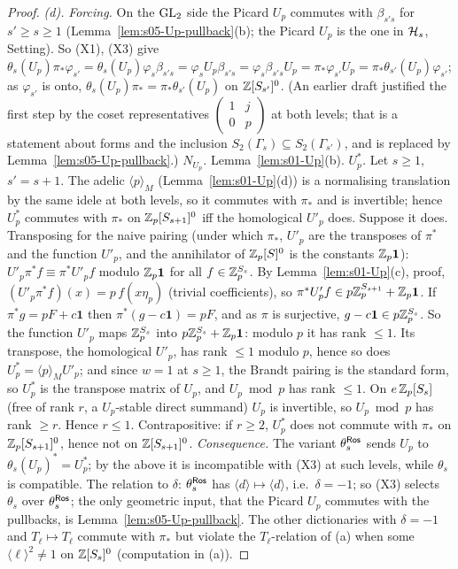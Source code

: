 \begin{proof}
\emph{(d).} \emph{Forcing.} On the $\mathrm{GL}_2$ side the Picard $U_p$ commutes with $\beta_{s's}$ for $s'\ge s\ge1$
(Lemma~\ref{lem:s05-Up-pullback}(b); the Picard $U_p$ is the one in $\mathcal{H}_s$, Setting). So (X1), (X3) give
$\theta_s(U_p)\pi_*\varphi_{s'}=\theta_s(U_p)\varphi_s\beta_{s's}=\varphi_sU_p\beta_{s's}=\varphi_s\beta_{s's}U_p=\pi_*\varphi_{s'}U_p=\pi_*\theta_{s'}(U_p)\varphi_{s'}$; as
$\varphi_{s'}$ is onto, $\theta_s(U_p)\pi_*=\pi_*\theta_{s'}(U_p)$ on $\mathbb{Z}[S_{s'}]^0$. (An earlier draft justified the first step by the coset
representatives $\left(\begin{smallmatrix}1&j\\0&p\end{smallmatrix}\right)$ at both levels; that is a statement about forms and the inclusion
$S_2(\Gamma_s)\subseteq S_2(\Gamma_{s'})$, and is replaced by Lemma~\ref{lem:s05-Up-pullback}.)
\emph{$N_{U_p}$.} Lemma~\ref{lem:s01-Up}(b).
\emph{$U_p^*$.} Let $s\ge1$, $s'=s+1$. The adelic $\langle p\rangle_M$ (Lemma~\ref{lem:s01-Up}(d)) is a normalising translation by the same
idele at both levels, so it commutes with $\pi_*$ and is invertible; hence $U_p^*$ commutes with $\pi_*$ on $\mathbb{Z}_p[S_{s+1}]^0$ iff the
homological $U'_p$ does. Suppose it does. Transposing for the naive pairing (under which $\pi_*$, $U'_p$ are the transposes of $\pi^*$
and the function $U'_p$, and the annihilator of $\mathbb{Z}_p[S]^0$ is the constants $\mathbb{Z}_p\mathbf 1$): $U'_p\pi^*f\equiv\pi^*U'_pf$ modulo $\mathbb{Z}_p\mathbf 1$ for all
$f\in\mathbb{Z}_p^{S_s}$. By Lemma~\ref{lem:s01-Up}(c), proof, $(U'_p\pi^*f)(x)=p\,f(x\eta_p)$ (trivial coefficients), so
$\pi^*U'_pf\in p\mathbb{Z}_p^{S_{s+1}}+\mathbb{Z}_p\mathbf 1$. If $\pi^*g=pF+c\mathbf 1$ then $\pi^*(g-c\mathbf 1)=pF$, and as $\pi$ is surjective,
$g-c\mathbf 1\in p\mathbb{Z}_p^{S_s}$. So the function $U'_p$ maps $\mathbb{Z}_p^{S_s}$ into $p\mathbb{Z}_p^{S_s}+\mathbb{Z}_p\mathbf 1$: modulo $p$ it has rank $\le1$. Its transpose,
the homological $U'_p$, has rank $\le1$ modulo $p$, hence so does $U_p^*=\langle p\rangle_MU'_p$; and since $w=1$ at $s\ge1$, the Brandt
pairing is the standard form, so $U_p^*$ is the transpose matrix of $U_p$, and $U_p\bmod p$ has rank $\le1$. On $e\,\mathbb{Z}_p[S_s]$ (free of
rank $r$, a $U_p$-stable direct summand) $U_p$ is invertible, so $U_p\bmod p$ has rank $\ge r$. Hence $r\le1$. Contrapositive: if
$r\ge2$, $U_p^*$ does not commute with $\pi_*$ on $\mathbb{Z}_p[S_{s+1}]^0$, hence not on $\mathbb{Z}[S_{s+1}]^0$.
\emph{Consequence.} The variant $\theta^{\mathsf{Ros}}_s$ sends $U_p$ to $\theta_s(U_p)^*=U_p^*$; by the above it is incompatible with (X3) at such
levels, while $\theta_s$ is compatible. The relation to $\delta$: $\theta^{\mathsf{Ros}}_s$ has $\langle d\rangle\mapsto\langle d\rangle$, i.e.\ $\delta=-1$; so (X3)
selects $\theta_s$ over $\theta^{\mathsf{Ros}}_s$; the only geometric input, that the Picard $U_p$ commutes with the pullbacks, is
Lemma~\ref{lem:s05-Up-pullback}. The other dictionaries with $\delta=-1$ and $T_\ell\mapsto T_\ell$ commute with $\pi_*$ but violate the $T_\ell$-relation of (a)
when some $\langle\ell\rangle^2\ne1$ on $\mathbb{Z}[S_s]^0$ (computation in (a)).
\end{proof}
